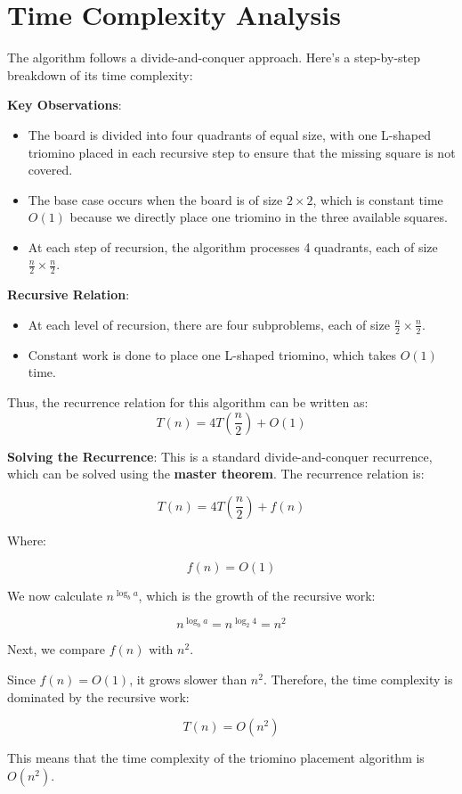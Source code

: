 \documentclass[a4paper,12pt]{report}
\begin{document}
\section*{Time Complexity Analysis}

The algorithm follows a divide-and-conquer approach. Here's a step-by-step breakdown of its time complexity:

\textbf{Key Observations}:
\begin{itemize}
    \item The board is divided into four quadrants of equal size, with one L-shaped triomino placed in each recursive step to ensure that the missing square is not covered.
    \item The base case occurs when the board is of size \(2 \times 2\), which is constant time \(O(1)\) because we directly place one triomino in the three available squares.
    \item At each step of recursion, the algorithm processes 4 quadrants, each of size \( \frac{n}{2} \times \frac{n}{2} \).
\end{itemize}

\textbf{Recursive Relation}:
\begin{itemize}
    \item At each level of recursion, there are four subproblems, each of size \( \frac{n}{2} \times \frac{n}{2} \).
    \item Constant work is done to place one L-shaped triomino, which takes \( O(1) \) time.
\end{itemize}

Thus, the recurrence relation for this algorithm can be written as:
\[
T(n) = 4T\left(\frac{n}{2}\right) + O(1)
\]

\textbf{Solving the Recurrence}:
This is a standard divide-and-conquer recurrence, which can be solved using the \textbf{master theorem}. 
The recurrence relation is:

\[
T(n) = 4T\left(\frac{n}{2}\right) + f(n)
\]

Where:

\[
f(n) = O(1)
\]

We now calculate \( n^{\log_b a} \), which is the growth of the recursive work:

\[
n^{\log_b a} = n^{\log_2 4} = n^2
\]

Next, we compare \( f(n) \) with \( n^2 \).

Since \( f(n) = O(1) \), it grows slower than \( n^2 \). Therefore, the time complexity is dominated by the recursive work:

\begin{tcolorbox}[colback=white, colframe=black, boxrule=0.5pt]
\[
T(n) = O(n^2)
\]
\end{tcolorbox}

This means that the time complexity of the triomino placement algorithm is \( O(n^2) \). 
\end{document}
